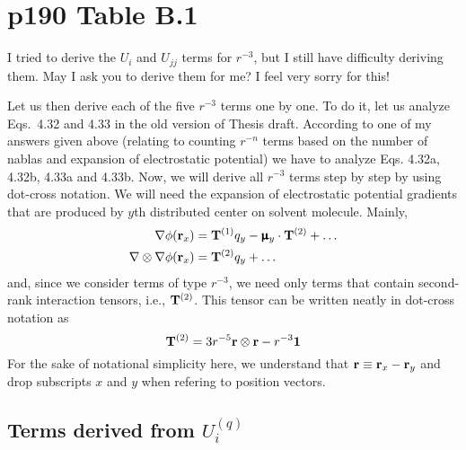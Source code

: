 \documentclass{exam}
\begin{document}
\section{p190 Table B.1}
\begin{questions}

%
\question I tried to derive the $U_i$ and $U_{jj}$ terms for $r^{-3}$, but I still have difficulty deriving them.
May I ask you to derive them for me? I feel very sorry for this!

\begin{solution}
Let us then derive each of the five $r^{-3}$ terms one by one. To do it, let us analyze
Eqs.~4.32 and 4.33 in the old version of Thesis draft. According to one of my answers given above
(relating to counting $r^{-n}$ terms based on the number of nablas and expansion of electrostatic
potential) we have to analyze Eqs. 4.32a, 4.32b, 4.33a and 4.33b. Now, we will derive all $r^{-3}$ terms
step by step by using dot-cross notation. We will need the expansion of electrostatic potential gradients
that are produced by $y$th distributed center on solvent molecule. Mainly,
%
\begin{subequations}
\begin{align}
 \nabla\phi({\bf r}_x)              &= {\bf T}^{(1)} q_y - \pmb{\upmu}_y \cdot {\bf T}^{(2)} + \ldots \\
 \nabla\otimes\nabla\phi({\bf r}_x) &= {\bf T}^{(2)} q_y + \ldots \\
\end{align}
\end{subequations}
%
and, since we consider terms of type $r^{-3}$, we need only terms that contain second-rank
interaction tensors, i.e., ${\bf T}^{(2)}$. This tensor can be written neatly in
dot-cross notation as
%
\begin{equation}
{\bf T}^{(2)} = 3 r^{-5} {\bf r}\otimes {\bf r}  - r^{-3} {\bf 1} 
\end{equation}
%
For the sake of notational simplicity here, we understand 
that ${\bf r}\equiv {\bf r}_x - {\bf r}_y$ and drop subscripts $x$ and $y$ when
refering to position vectors.

\subsection{Terms derived from $U_i^{(q)}$}


\end{solution}
\end{questions}
\end{document}
